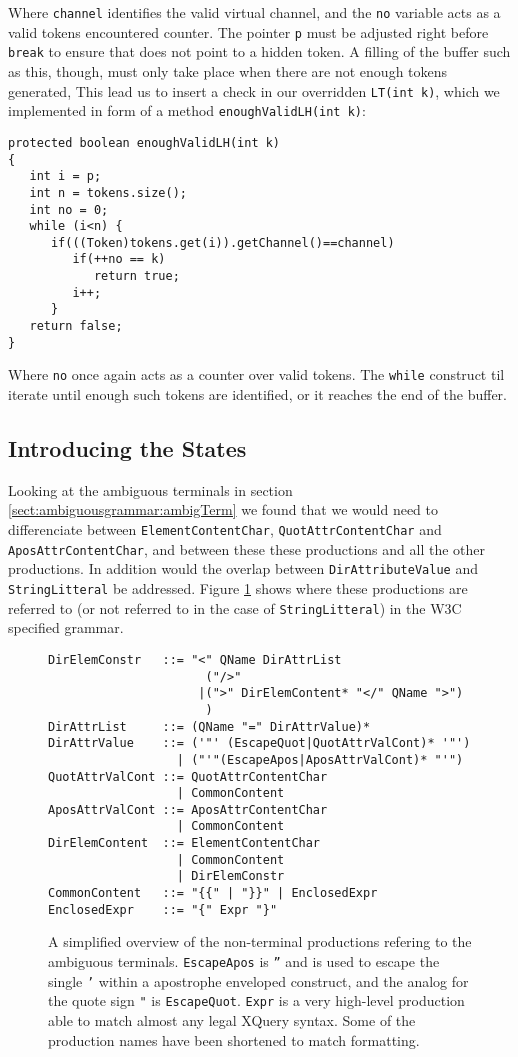 Where \verb!channel! identifies the valid virtual channel, and the \verb!no! variable acts as a valid tokens encountered counter. The pointer \verb!p! must be adjusted right before \verb!break! to ensure that does not point to a hidden token. A filling of the buffer such as this, though, must only take place when there are not enough tokens generated, This lead us to insert a check in our overridden \verb!LT(int k)!, which we implemented in form of a method \verb!enoughValidLH(int k)!:
\begin{verbatim}
protected boolean enoughValidLH(int k)
{
   int i = p;
   int n = tokens.size();
   int no = 0;
   while (i<n) {
      if(((Token)tokens.get(i)).getChannel()==channel)
         if(++no == k)
            return true;
         i++;
      }
   return false;
}
\end{verbatim}
Where \verb!no! once again acts as a counter over valid tokens. The \verb!while! construct til iterate until enough such tokens are identified, or it reaches the end of the buffer.

\subsection{Introducing the States}
\label{sect:rewriteGrammar:introduceStates}
Looking at the ambiguous terminals in section \ref{sect:ambiguousgrammar:ambigTerm} we found that we would need to differenciate between \verb!ElementContentChar!, \verb!QuotAttrContentChar! and \verb!AposAttrContentChar!, and between these these productions and all the other productions. In addition would the overlap between \verb!DirAttributeValue! and \verb!StringLitteral! be addressed. Figure \ref{fig:ambigTerminalRef} shows where these productions are referred to (or not referred to in the case of \verb!StringLitteral!) in the W3C specified grammar. 
\begin{figure}[h!]
\begin{verbatim}
DirElemConstr   ::= "<" QName DirAttrList 
                      ("/>" 
                     |(">" DirElemContent* "</" QName ">")
                      )
DirAttrList     ::= (QName "=" DirAttrValue)*
DirAttrValue    ::= ('"' (EscapeQuot|QuotAttrValCont)* '"')
                  | ("'"(EscapeApos|AposAttrValCont)* "'")
QuotAttrValCont ::= QuotAttrContentChar
                  | CommonContent
AposAttrValCont ::= AposAttrContentChar
                  | CommonContent
DirElemContent  ::= ElementContentChar
                  | CommonContent
                  | DirElemConstr
CommonContent   ::= "{{" | "}}" | EnclosedExpr
EnclosedExpr    ::= "{" Expr "}"
\end{verbatim}
\caption[Grammar reffering to amiguous terminals.]{A simplified overview of the non-terminal productions refering to the ambiguous terminals. \texttt{EscapeApos} is \texttt{''} and is used to escape the single \texttt{'} within a apostrophe enveloped construct, and the analog for the quote sign \texttt{"} is \texttt{EscapeQuot}. \texttt{Expr} is a very high-level production able to match almost any legal XQuery syntax. Some of the production names have been shortened to match formatting.}
\label{fig:ambigTerminalRef}
\end{figure}

